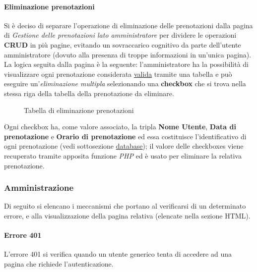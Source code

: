 \documentclass{article}
\begin{document}
\paragraph*{Eliminazione prenotazioni}
Si è deciso di separare l'operazione di eliminazione delle prenotazioni dalla pagina di \textit{Gestione delle prenotazioni lato amministratore} per dividere le operazioni \textbf{CRUD} in più pagine, evitando un sovraccarico cognitivo da parte dell'utente amministratore (dovuto alla presenza di troppe informazioni in un'unica pagina).\\
La logica seguita dalla pagina è la seguente: l'amministratore ha la possibilità di visualizzare ogni prenotazione considerata \hyperref[prenotazioni:valida]{\underline{valida}} tramite una tabella e può eseguire un'\textit{eliminazione multipla} selezionando una \textbf{checkbox} che si trova nella stessa riga della tabella della prenotazione da eliminare. \\

\begin{figure}[H]
	\centering
	\caption{Tabella di eliminazione prenotazioni}
\end{figure}

Ogni checkbox ha, come valore associato, la tripla \textbf{Nome Utente}, \textbf{Data di prenotazione} e \textbf{Orario di prenotazione} ed essa costituisce l'identificativo di ogni prenotazione (vedi sottosezione \hyperref[subsec:database]{\underline{database}}); il valore delle checkboxes viene recuperato tramite apposita funzione \textit{PHP} ed è usato per eliminare la relativa prenotazione.

\subsubsection{Amministrazione}
Di seguito si elencano i meccanismi che portano al verificarsi di un determinato errore, e alla visualizzazione della pagina relativa (elencate nella sezione HTML).
\paragraph*{Errore 401}
L'errore 401 si verifica quando un utente generico tenta di accedere ad una pagina che richiede l'autenticazione.
\end{document}
